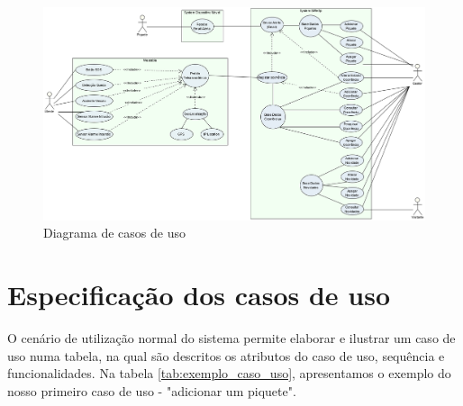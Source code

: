 \begin{figure}[!htb]
		\includegraphics[width=\textwidth]{figuras/diagrama_casos_uso.png}
		\caption{Diagrama de casos de uso}
		\label{fig:diagrama_casos_uso}
\end{figure}

\section{Especificação dos casos de uso}

O cenário de utilização normal do sistema permite elaborar e ilustrar um caso de uso numa tabela, na qual são descritos os atributos do caso de uso, sequência e funcionalidades. Na tabela \ref{tab:exemplo_caso_uso}, apresentamos o exemplo do nosso primeiro caso de uso - "adicionar um piquete".

